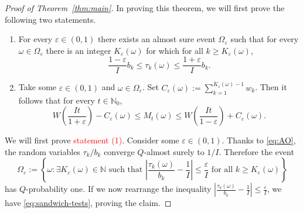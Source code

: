 \documentclass[10pt,a4paper]{amsart}
\newcommand{\NN}{\mathbb N}
\begin{document}
\begin{proof}[Proof of Theorem~\ref{thm:main}]
In proving this theorem, we will first prove the following two statements.

\begin{enumerate}
    \item For every $\varepsilon\in(0,1)$ there exists an almost sure event $\Omega_\varepsilon$ such that for every $\omega\in\Omega_\varepsilon$ there is an integer $K_\varepsilon(\omega)$ for which for all $k\ge K_\varepsilon(\omega)$,
    \begin{equation}\label{eq:sandwich-tests}
    \frac{1-\varepsilon}{I}b_k\le \tau_k(\omega)\le \frac{1+\varepsilon}{I}b_k. 
    \end{equation}
    \item Take some $\varepsilon\in(0,1)$ and $\omega\in\Omega_\varepsilon$. Set $C_\varepsilon(\omega):=\sum_{k=1}^{K_\varepsilon(\omega)-1}w_k$. Then it follows that for every $t\in\mathbb N_0$,
    \begin{equation}\label{eq:M-sandwich}
    W\left(\frac{It}{1+\varepsilon}\right)-C_\varepsilon(\omega)\le M_t(\omega) \le W\left(\frac{It}{1-\varepsilon}\right)+C_\varepsilon(\omega).    
    \end{equation}
\end{enumerate}

We will first prove \textcolor{red}{statement (1)}. Consider some $\varepsilon\in(0,1)$. Thanks to \eqref{eq:AO}, the random variables $\tau_k/b_k$ converge $Q$-almost surely to $1/I$. Therefore the event
\[
\Omega_\varepsilon:=\left\{\omega : \exists K_\varepsilon(\omega)\in\NN \text{ such that } \left| \frac{\tau_k(\omega)}{b_k} - \frac{1}{I} \right| \le \frac{\varepsilon}{I} \text{ for all } k\ge K_\varepsilon(\omega) \right\}
\]
has $Q$-probability one. If we now rearrange the inequality $\left|\frac{\tau_k(\omega)}{b_k}-\frac{1}{I}\right|\le \frac{\varepsilon}{I}$, we have \eqref{eq:sandwich-tests}, proving the claim.


\end{proof}
\end{document}
